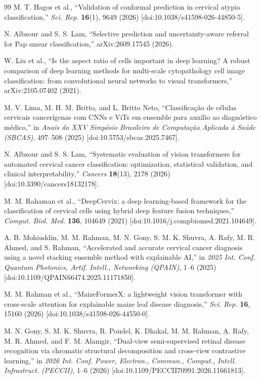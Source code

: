\documentclass[12pt,letterpaper]{article}
\begin{document}
{\begin{thebibliography}{99}
M. T. Hagos et al., ``Validation of conformal prediction in cervical atypia classification,'' \textit{Sci. Rep.} \textbf{16}(1), 9649 (2026) [doi:10.1038/s41598-026-44850-5].

N. Albzour and S. S. Lam, ``Selective prediction and uncertainty-aware referral for Pap smear classification,'' arXiv:2609.17545 (2026).

W. Liu et al., ``Is the aspect ratio of cells important in deep learning? A robust comparison of deep learning methods for multi-scale cytopathology cell image classification: from convolutional neural networks to visual transformers,'' arXiv:2105.07402 (2021).

M. V. Lima, M. H. M. Britto, and L. Britto Neto, ``Classifica\c{c}\~ao de c\'elulas cervicais cancer\'igenas com CNNs e ViTs em ensemble para aux\'ilio ao diagn\'ostico m\'edico,'' in \textit{Anais do XXV Simp\'osio Brasileiro de Computa\c{c}\~ao Aplicada \`a Sa\'ude (SBCAS)}, 497--508 (2025) [doi:10.5753/sbcas.2025.7467].

N. Albzour and S. S. Lam, ``Systematic evaluation of vision transformers for automated cervical cancer classification: optimization, statistical validation, and clinical interpretability,'' \textit{Cancers} \textbf{18}(13), 2178 (2026) [doi:10.3390/cancers18132178].

M. M. Rahaman et al., ``DeepCervix: a deep learning-based framework for the classification of cervical cells using hybrid deep feature fusion techniques,'' \textit{Comput. Biol. Med.} \textbf{136}, 104649 (2021) [doi:10.1016/j.compbiomed.2021.104649].

A. B. Mohiuddin, M. M. Rahman, M. N. Gony, S. M. K. Shuvra, A. Rafy, M. R. Ahmed, and S. Rahman, ``Accelerated and accurate cervical cancer diagnosis using a novel stacking ensemble method with explainable AI,'' in \textit{2025 Int. Conf. Quantum Photonics, Artif. Intell., Networking (QPAIN)}, 1--6 (2025) [doi:10.1109/QPAIN66474.2025.11171850].

M. M. Rahman et al., ``MaizeFormerX: a lightweight vision transformer with cross-scale attention for explainable maize leaf disease diagnosis,'' \textit{Sci. Rep.} \textbf{16}, 15160 (2026) [doi:10.1038/s41598-026-44550-0].

M. N. Gony, S. M. K. Shuvra, R. Poudel, K. Dhakal, M. M. Rahman, A. Rafy, M. R. Ahmed, and F. M. Alamgir, ``Dual-view semi-supervised retinal disease recognition via chromatic structural decomposition and cross-view contrastive learning,'' in \textit{2026 Int. Conf. Power, Electron., Commun., Comput., Intell. Infrastruct. (PECCII)}, 1--6 (2026) [doi:10.1109/PECCII70991.2026.11661813].


\end{thebibliography}}
\end{document}
